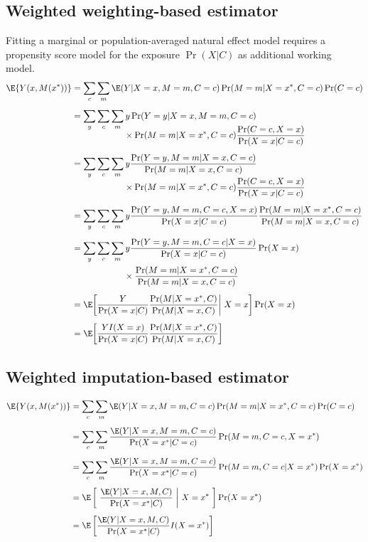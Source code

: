 \documentclass[nojss]{jss}
\begin{document}
\begin{fleqn}
\subsection[]{Weighted weighting-based estimator \citep{Lange2012}}\label{app:wweightest}
Fitting a marginal or population-averaged natural effect model requires a propensity score model for the exposure $\Pr(X|C)$ as additional working model.
\begin{align*}
\E\{Y(x,M(x^*))\} &= \sum_c \sum_m \E(Y|X=x,M=m,C=c) \Pr(M=m|X=x^*,C=c) \Pr(C=c)\\[5pt]
&= \sum_y \sum_c \sum_m  y \Pr(Y=y|X=x,M=m,C=c)\\[-10pt] & \qquad \qquad \qquad {} \times \Pr(M=m|X=x^*,C=c) \dfrac{\Pr(C=c, X = x)}{\Pr(X = x \vert C=c)}\\[5pt]
&= \sum_y \sum_c \sum_m y \dfrac{\Pr(Y=y,M=m|X=x,C=c)}{\Pr(M=m|X=x,C=c)}\\[-5pt] & \qquad \qquad \qquad {} \times \Pr(M=m|X=x^*,C=c) \dfrac{\Pr(C=c, X = x)}{\Pr(X = x \vert C=c)}\\[5pt]
&= \sum_y \sum_c \sum_m y \dfrac{\Pr(Y=y,M=m,C=c,X=x)}{\Pr(X = x \vert C=c)} \dfrac{\Pr(M=m|X=x^*,C=c)}{\Pr(M=m|X=x,C=c)}\\[5pt]
&= \sum_y \sum_c \sum_m y \dfrac{\Pr(Y=y,M=m,C=c\vert X=x)}{\Pr(X = x \vert C=c)} \Pr(X=x)\\[0pt] & \qquad \qquad \qquad {} \times \dfrac{\Pr(M=m|X=x^*,C=c)}{\Pr(M=m|X=x,C=c)} \\[5pt]
&= \E\biggl[\dfrac{Y}{\Pr(X = x \vert C)} \dfrac{\Pr(M|X=x^*,C)}{\Pr(M|X=x,C)} \bigg\vert\ X=x \biggr] \Pr(X=x)\\[5pt]
&= \E\biggl[\dfrac{Y I(X=x)}{\Pr(X = x \vert C)} \dfrac{\Pr(M|X=x^*,C)}{\Pr(M|X=x,C)} \biggr]
\end{align*}

\subsection[]{Weighted imputation-based estimator \citep[related to][]{Albert2012a}}\label{app:wimpest}
\begin{align*}
\E\{Y(x,M(x^*))\} &= \sum_c \sum_m \E(Y|X=x,M=m,C=c) \Pr(M=m|X=x^*,C=c) \Pr(C=c)\\[5pt]
&= \sum_c \sum_m \dfrac{\E(Y|X=x,M=m,C=c)}{\Pr(X = x^* \vert C=c)} \Pr(M=m,C=c,X=x^*)\\[5pt]
&= \sum_c \sum_m \dfrac{\E(Y|X=x,M=m,C=c)}{\Pr(X = x^* \vert C=c)} \Pr(M=m,C=c\vert X=x^*) \Pr(X = x^*)\\[5pt]
&= \E\left[\
\dfrac{\E(Y|X=x,M,C)}{\Pr(X=x^*|C)}
\ \middle\vert\ X=x^*
\ \right] \Pr(X = x^*)\\[5pt]
&= \E\left[\dfrac{\E(Y|X=x,M,C)}{\Pr(X=x^*|C)}  I(X=x^*)\right]
\end{align*}
\end{fleqn}


\newpage
\end{document}
